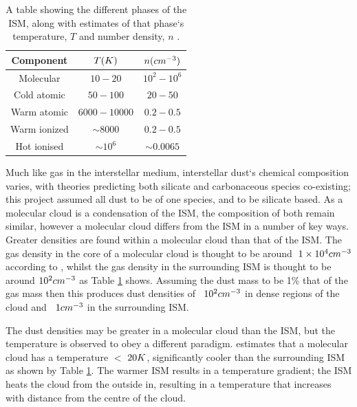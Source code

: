 \documentclass{report}
\begin{document}
\begin{table}[h]
  \centering
   \begin{tabular}{||c c c||}
   \hline
   Component & $T\/(K)$ & $n\/(cm^{-3})$ \\ [0.5ex]
   \hline\hline
   Molecular    & $10-20$      & $10^{2}-10^{6}$ \\
   \hline
   Cold atomic  & $50-100$     & $20-50$ \\
   \hline
   Warm atomic  & $6000-10000$ & $0.2-0.5$ \\
   \hline
   Warm ionized & $\sim8000$    & $0.2-0.5$ \\
   \hline
   Hot ionised  & $\sim10^{6}$  & $\sim0.0065$ \\ [1ex]
   \hline
   \end{tabular}
   \caption{A table showing the different phases of the ISM, along with estimates of that phase`s temperature, $T$ and number density, $n$ \parencite{ism}.}
   \label{table:ism}
\end{table}

Much like gas in the interstellar medium, interstellar dust`s chemical composition varies, with theories predicting both silicate and carbonaceous species co-existing; this project assumed all dust to be of one species, and to be silicate based. As a molecular cloud is a condensation of the ISM, the composition of both remain similar, however a molecular cloud differs from the ISM in a number of key ways. Greater densities are found within a molecular cloud than that of the ISM. The gas density in the core of a molecular cloud is thought to be around $~$$1\times10^{4}\/cm^{-3}$ according to \textcite{density}, whilst the gas density in the surrounding ISM is thought to be around $10^{2}\/cm^{-3}$ as Table \ref{table:ism} shows. Assuming the dust mass to be 1\% that of the gas mass then this produces dust densities of $~$ $10^{2}\/cm^{-3}$ in dense regions of the cloud and $~$ $1\/cm^{-3}$ in the surrounding ISM.

The dust densities may be greater in a molecular cloud than the ISM, but the temperature is observed to obey a different paradigm. \textcite{dustopacity} estimates that a molecular cloud has a temperature $<$ $20\/K$, significantly cooler than the surrounding ISM as shown by Table \ref{table:ism}. The warmer ISM results in a temperature gradient; the ISM heats the cloud from the outside in, resulting in a temperature that increases with distance from the centre of the cloud.
\end{document}
